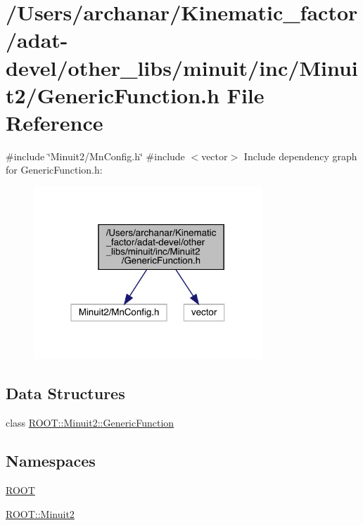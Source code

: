 \hypertarget{adat-devel_2other__libs_2minuit_2inc_2Minuit2_2GenericFunction_8h}{}\section{/\+Users/archanar/\+Kinematic\+\_\+factor/adat-\/devel/other\+\_\+libs/minuit/inc/\+Minuit2/\+Generic\+Function.h File Reference}
\label{adat-devel_2other__libs_2minuit_2inc_2Minuit2_2GenericFunction_8h}
{\ttfamily \#include \char`\"{}Minuit2/\+Mn\+Config.\+h\char`\"{}}\newline
{\ttfamily \#include $<$vector$>$}\newline
Include dependency graph for Generic\+Function.\+h\+:
\nopagebreak
\begin{figure}[H]
\begin{center}
\leavevmode
\includegraphics[width=244pt]{d8/d96/adat-devel_2other__libs_2minuit_2inc_2Minuit2_2GenericFunction_8h__incl}
\end{center}
\end{figure}
\subsection*{Data Structures}
\begin{DoxyCompactItemize}
\item 
class \mbox{\hyperlink{classROOT_1_1Minuit2_1_1GenericFunction}{R\+O\+O\+T\+::\+Minuit2\+::\+Generic\+Function}}
\end{DoxyCompactItemize}
\subsection*{Namespaces}
\begin{DoxyCompactItemize}
\item 
 \mbox{\hyperlink{namespaceROOT}{R\+O\+OT}}
\item 
 \mbox{\hyperlink{namespaceROOT_1_1Minuit2}{R\+O\+O\+T\+::\+Minuit2}}
\end{DoxyCompactItemize}
